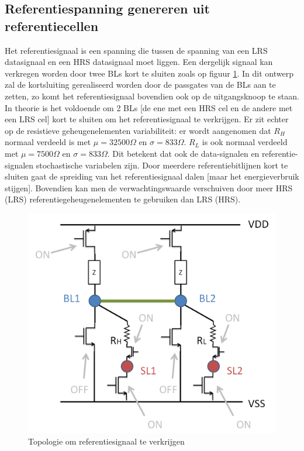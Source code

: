 \subsection{Referentiespanning genereren uit referentiecellen}
\label{refread}
Het referentiesignaal is een spanning die tussen de spanning van een LRS datasignaal en een HRS datasignaal moet liggen. Een dergelijk signaal kan verkregen worden door twee BLs kort te sluiten zoals op figuur \ref{fig:2cellref}. In dit ontwerp zal de kortsluiting gerealiseerd worden door de passgates van de BLs aan te zetten, zo komt het referentiesignaal bovendien ook op de uitgangsknoop te staan. In theorie is het voldoende om 2 BLs [de ene met een HRS cel en de andere met een LRS cel] kort te sluiten om het referentiesignaal te verkrijgen. Er zit echter op de resistieve geheugenelementen variabiliteit: er wordt aangenomen dat $R_{H}$ normaal verdeeld is met $\mu = 32500\Omega$ en $\sigma = 833\Omega$. $R_{L}$ is ook normaal verdeeld met $\mu = 7500\Omega$ en $\sigma = 833\Omega$. Dit betekent dat ook de data-signalen en referentie-signalen stochastische variabelen zijn.
Door meerdere referentiebitlijnen kort te sluiten gaat de spreiding van het referentiesignaal dalen [maar het energieverbruik stijgen]. Bovendien kan men de verwachtingswaarde verschuiven door meer HRS (LRS) referentiegeheugenelementen te gebruiken dan LRS (HRS).

\begin{figure}
  \centering
  \includegraphics[scale=0.3]{../fig/hfdstk-architecture-ref2cell.png}
  \caption[Referentiesignaal uitlezen]{Topologie om referentiesignaal te verkrijgen}
  \label{fig:2cellref}
\end{figure}

